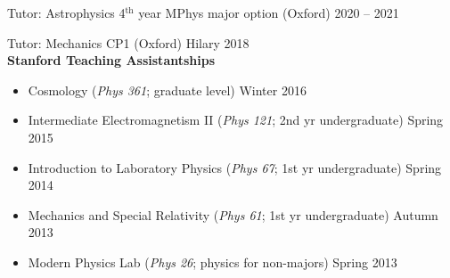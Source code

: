 \documentclass[11pt]{article}
\newenvironment{outerlist}[1][\enskip\textbullet]%
        {\begin{itemize}[#1]}{\end{itemize}%
         \vspace{-.6\baselineskip}}
\begin{document}
Tutor: Astrophysics 4$^\text{th}$ year MPhys major option (Oxford) \hfill 2020 -- 2021\\

\vspace{-0.35\baselineskip}

Tutor: Mechanics CP1 (Oxford) \hfill Hilary 2018\\


\textbf{Stanford Teaching Assistantships}
\vspace{-0.35\baselineskip}
\begin{outerlist}
\item[] Cosmology (\textit{Phys 361}; graduate level) \hfill Winter 2016\\
\vspace{-1.4\baselineskip}
\item[] Intermediate Electromagnetism II (\textit{Phys 121}; 2nd yr undergraduate) \hfill Spring 2015\\
\vspace{-1.4\baselineskip}
\item[] Introduction to Laboratory Physics (\textit{Phys 67}; 1st yr undergraduate) \hfill Spring 2014\\
\vspace{-1.4\baselineskip}
\item[] Mechanics and Special Relativity (\textit{Phys 61}; 1st yr undergraduate) \hfill Autumn 2013\\
\vspace{-1.4\baselineskip}
\item[] Modern Physics Lab (\textit{Phys 26}; physics for non-majors) \hfill Spring 2013\\
\end{outerlist}

\end{document}
